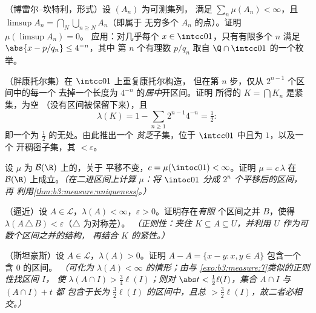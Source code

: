 \begin{exercise}[$\star\star$]\label{exo:b3:measure:4}
（博雷尔--坎特利，形式）设 $(A_n)$ 为可测集列，
满足 $\sum_n\mu(A_n) < \infty$，且 $\limsup A_n =
\bigcap_N\bigcup_{n\geq N}A_n$（即属于
无穷多个 $A_n$ 的点）。证明 $\mu(\limsup A_n) = 0$。
应用：对几乎每个 $x \in \intcc01$，只有有限多个
$n$ 满足 $\abs{x - p/q_n} \leq 4^{-n}$，其中
第 $n$ 个有理数 $p/q_n$ 取自
$\Q\cap\intcc01$ 的一个枚举。
\end{exercise}

\begin{exercise}[$\star\star$]\label{exo:b3:measure:5}
（胖康托尔集）在 $\intcc01$ 上重复康托尔构造，
但在第 $n$ 步，仅从 $2^{n-1}$ 个区间中的每一个
去掉一个长度为 $4^{-n}$ 的\emph{居中}开区间。证明
所得的 $K = \bigcap K_n$ 是紧集，为空
（没有区间被保留下来），且
\[
\lambda(K) = 1 - \sum_{n\geq1}2^{n-1}4^{-n} = \tfrac12 :
\]
即一个为 $\frac12$ 的无处。由此推出一个
\emph{贫乏}子集，位于 $\intcc01$ 中且为 $1$，以及一个
开稠密子集，其 $< \varepsilon$。
\end{exercise}

\begin{exercise}[$\star\star$]\label{exo:b3:measure:6}
设 $\mu$ 为 $\mathcal B(\R)$ 上的，关于
平移不变，$c = \mu(\intoc01) < \infty$。证明 $\mu =
c\,\lambda$ 在 $\mathcal B(\R)$ 上成立。\emph{（在二进区间上计算 $\mu$：将
$\intoc01$ 分成 $2^n$ 个平移后的区间，再
利用\cref{thm:b3:measure:uniqueness}。）}
\end{exercise}

\begin{exercise}[$\star\star$]\label{exo:b3:measure:7}
（逼近）设 $A \in \mathcal L$，$\lambda(A) <
\infty$，$\varepsilon > 0$。证明存在\emph{有限}
个区间之并 $B$，使得 $\lambda(A\,\triangle\,B) <
\varepsilon$（$\triangle$ 为对称差）。
\emph{（正则性：夹住 $K \subseteq A \subseteq U$，并利用
 $U$ 作为可数个区间之并的结构，
再结合 $K$ 的紧性。）}
\end{exercise}

\begin{exercise}[$\star\star\star$]\label{exo:b3:measure:8}
（斯坦豪斯）设 $A \in \mathcal L$，$\lambda(A) > 0$。证明
$A - A = \{x - y : x, y \in A\}$ 包含一个
含 $0$ 的区间。
\emph{（可化为 $\lambda(A) < \infty$ 的情形；由与
\cref{exo:b3:measure:7}类似的正则性找区间 $I$，
使 $\lambda(A \cap I) > \frac34\ell(I)$；则对 $\abs t <
\frac12\ell(I)$，集合 $A\cap I$ 与 $(A\cap I) + t$ 都
包含于长为 $\frac32\ell(I)$ 的区间中，且总
$> \frac32\ell(I)$，故二者必相交。）}
\end{exercise}

